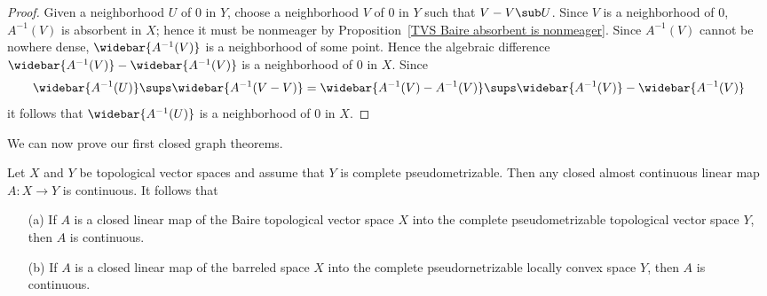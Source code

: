 \begin{proof}
Given a neighborhood $U$ of $0$ in $Y$, choose a neighborhood $V$ of $0$ in $Y$ such that $V-V\sub U$. Since $V$ is a neighborhood of $0$, $A^{-1}(V)$ is absorbent in $X$; hence it must be nonmeager by Proposition~\ref{TVS Baire absorbent is nonmeager}. Since $A^{-1}(V)$ cannot be nowhere dense, $\widebar{A^{-1}(V)}$ is a neighborhood of some point. Hence the algebraic difference $\widebar{A^{-1}(V)}-\widebar{A^{-1}(V)}$ is a neighborhood of $0$ in $X$. Since
\[\widebar{A^{-1}(U)}\sups \widebar{A^{-1}(V-V)}=\widebar{A^{-1}(V)-A^{-1}(V)}\sups \widebar{A^{-1}(V)}-\widebar{A^{-1}(V)}\]
it follows that $\widebar{A^{-1}(U)}$ is a neighborhood of $0$ in $X$.
\end{proof}
We can now prove our first closed graph theorems.
\begin{theorem}\label{closed graph theorem}
Let $X$ and $Y$ be topological vector spaces and assume that $Y$ is complete pseudometrizable. Then any closed almost continuous linear map $A:X\to Y$ is continuous. It follows that
\begin{itemize}
\item[(a)] If $A$ is a closed linear map of the Baire topological vector space $X$ into the complete pseudometrizable topological vector space $Y$, then $A$ is continuous.
\item[(b)] If $A$ is a closed linear map of the barreled space $X$ into the complete pseudornetrizable locally convex space $Y$, then $A$ is continuous. 
\end{itemize}
\end{theorem}
